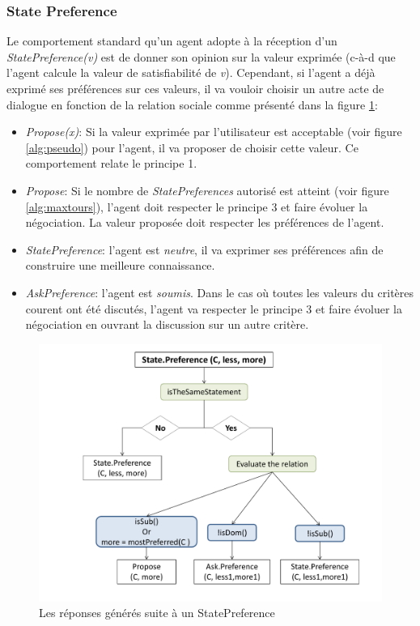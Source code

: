 	\subsubsection{State Preference}
	Le comportement standard qu'un agent adopte à la réception d'un \emph{StatePreference(v)} est de donner son opinion sur la valeur exprimée (c-à-d que l'agent calcule la valeur de satisfiabilité de \textit{v}). Cependant, si l'agent a déjà exprimé ses préférences sur ces valeurs, il va vouloir choisir un autre acte de dialogue en fonction de la relation sociale comme présenté dans la figure \ref{fig:SP}:
	\begin{itemize}
		\item \emph{Propose(x)}: Si la valeur exprimée par l'utilisateur est acceptable (voir figure \ref{alg:pseudo}) pour l'agent, il va proposer de choisir cette valeur. Ce comportement relate le principe 1.
		\item \emph{Propose}: Si le nombre de \emph{StatePreferences} autorisé est atteint (voir figure \ref{alg:maxtours}), l'agent doit respecter le principe 3 et faire évoluer la négociation. La valeur proposée doit respecter les préférences de l'agent. 
		\item \emph{StatePreference}: l'agent est \emph{neutre}, il va exprimer ses préférences afin de construire une meilleure connaissance.
		\item \emph{AskPreference}: l'agent est \emph{soumis}. Dans le cas où toutes les valeurs du critères courent ont été discutés, l'agent va respecter le principe 3 et faire évoluer la négociation en ouvrant la discussion sur un autre critère.
	\end{itemize}
	
	\begin{figure}[!t]
		\centering
		\includegraphics[width=4.5in] {Figures/chap4/statePref.pdf}
		\caption{Les réponses générés suite à un StatePreference}
		\label{fig:SP}
	\end{figure}
%	
	
